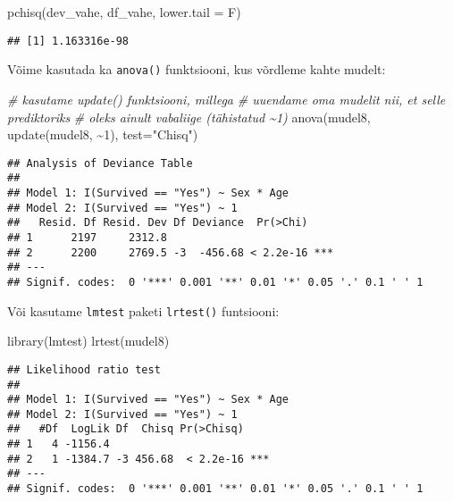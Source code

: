 \documentclass[
]{book}
\newenvironment{Shaded}{\begin{snugshade}}{\end{snugshade}}
\newcommand{\AttributeTok}[1]{\textcolor[rgb]{0.77,0.63,0.00}{#1}}
\newcommand{\CommentTok}[1]{\textcolor[rgb]{0.56,0.35,0.01}{\textit{#1}}}
\newcommand{\DecValTok}[1]{\textcolor[rgb]{0.00,0.00,0.81}{#1}}
\newcommand{\FunctionTok}[1]{\textcolor[rgb]{0.00,0.00,0.00}{#1}}
\newcommand{\NormalTok}[1]{#1}
\newcommand{\SpecialCharTok}[1]{\textcolor[rgb]{0.00,0.00,0.00}{#1}}
\newcommand{\StringTok}[1]{\textcolor[rgb]{0.31,0.60,0.02}{#1}}
\begin{document}
\begin{Shaded}
\begin{Highlighting}[]
\FunctionTok{pchisq}\NormalTok{(dev\_vahe, df\_vahe, }\AttributeTok{lower.tail =}\NormalTok{ F)}
\end{Highlighting}
\end{Shaded}

\begin{verbatim}
## [1] 1.163316e-98
\end{verbatim}

Võime kasutada ka \texttt{anova()} funktsiooni, kus võrdleme kahte mudelt:

\begin{Shaded}
\begin{Highlighting}[]
\CommentTok{\# kasutame update() funktsiooni, millega}
\CommentTok{\# uuendame oma mudelit nii, et selle prediktoriks}
\CommentTok{\# oleks ainult vabaliige (tähistatud \textasciitilde{}1)}
\FunctionTok{anova}\NormalTok{(mudel8,}
      \FunctionTok{update}\NormalTok{(mudel8, }\SpecialCharTok{\textasciitilde{}}\DecValTok{1}\NormalTok{),    }
      \AttributeTok{test=}\StringTok{"Chisq"}\NormalTok{)}
\end{Highlighting}
\end{Shaded}

\begin{verbatim}
## Analysis of Deviance Table
## 
## Model 1: I(Survived == "Yes") ~ Sex * Age
## Model 2: I(Survived == "Yes") ~ 1
##   Resid. Df Resid. Dev Df Deviance  Pr(>Chi)    
## 1      2197     2312.8                          
## 2      2200     2769.5 -3  -456.68 < 2.2e-16 ***
## ---
## Signif. codes:  0 '***' 0.001 '**' 0.01 '*' 0.05 '.' 0.1 ' ' 1
\end{verbatim}

Või kasutame \texttt{lmtest} paketi \texttt{lrtest()} funtsiooni:

\begin{Shaded}
\begin{Highlighting}[]
\FunctionTok{library}\NormalTok{(lmtest)}
\FunctionTok{lrtest}\NormalTok{(mudel8)}
\end{Highlighting}
\end{Shaded}

\begin{verbatim}
## Likelihood ratio test
## 
## Model 1: I(Survived == "Yes") ~ Sex * Age
## Model 2: I(Survived == "Yes") ~ 1
##   #Df  LogLik Df  Chisq Pr(>Chisq)    
## 1   4 -1156.4                         
## 2   1 -1384.7 -3 456.68  < 2.2e-16 ***
## ---
## Signif. codes:  0 '***' 0.001 '**' 0.01 '*' 0.05 '.' 0.1 ' ' 1
\end{verbatim}
\end{document}
